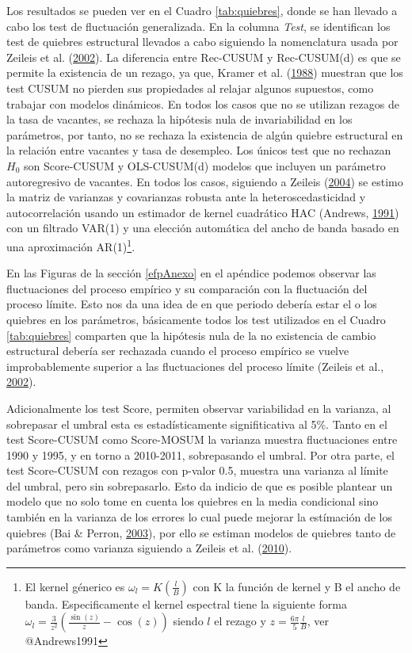 \documentclass[12pt,oneside]{reedthesis}
\begin{document}
Los resultados se pueden ver en el Cuadro \ref{tab:quiebres}, donde se han llevado a cabo los test de fluctuación generalizada. En la columna \emph{Test}, se identifican los test de quiebres estructural llevados a cabo siguiendo la nomenclatura usada por Zeileis et al. (\protect\hyperlink{ref-Zeileis2002}{2002}). La diferencia entre Rec-CUSUM y Rec-CUSUM(d) es que se permite la existencia de un rezago, ya que, Kramer et al. (\protect\hyperlink{ref-Society1988}{1988}) muestran que los test CUSUM no pierden sus propiedades al relajar algunos supuestos, como trabajar con modelos dinámicos. En todos los casos que no se utilizan rezagos de la tasa de vacantes, se rechaza la hipótesis nula de invariabilidad en los parámetros, por tanto, no se rechaza la existencia de algún quiebre estructural en la relación entre vacantes y tasa de desempleo. Los únicos test que no rechazan \(H_0\) son Score-CUSUM y OLS-CUSUM(d) modelos que incluyen un parámetro autoregresivo de vacantes. En todos los casos, siguiendo a Zeileis (\protect\hyperlink{ref-Zeileis2004}{2004}) se estimo la matriz de varianzas y covarianzas robusta ante la heteroscedasticidad y autocorrelación usando un estimador de kernel cuadrático HAC (Andrews, \protect\hyperlink{ref-Andrews1991}{1991}) con un filtrado VAR(1) y una elección automática del ancho de banda basado en una aproximación AR(1)\footnote{El kernel génerico es $\omega_l = K(\frac{l}{B})$ con K la función de kernel y B el ancho de banda. Especificamente el kernel espectral tiene la siguiente forma $\omega_l = \frac{3}{z^2}(\frac{\sin(z)}{z} - \cos(z))$ siendo $l$ el rezago y $z = \frac{6\pi}{5}\frac{l}{B}$, ver @Andrews1991}.

En las Figuras de la sección \ref{efpAnexo} en el apéndice podemos observar las fluctuaciones del proceso empírico y su comparación con la fluctuación del proceso límite. Esto nos da una idea de en que periodo debería estar el o los quiebres en los parámetros, básicamente todos los test utilizados en el Cuadro \ref{tab:quiebres} comparten que la hipótesis nula de la no existencia de cambio estructural debería ser rechazada cuando el proceso empírico se vuelve improbablemente superior a las fluctuaciones del proceso límite (Zeileis et al., \protect\hyperlink{ref-Zeileis2002}{2002}).

Adicionalmente los test Score, permiten observar variabilidad en la varianza, al sobrepasar el umbral esta es estadísticamente signifiticativa al 5\%. Tanto en el test Score-CUSUM como Score-MOSUM la varianza muestra fluctuaciones entre 1990 y 1995, y en torno a 2010-2011, sobrepasando el umbral. Por otra parte, el test Score-CUSUM con rezagos con p-valor 0.5, muestra una varianza al límite del umbral, pero sin sobrepasarlo. Esto da indicio de que es posible plantear un modelo que no solo tome en cuenta los quiebres en la media condicional sino también en la varianza de los errores lo cual puede mejorar la estímación de los quiebres (Bai \& Perron, \protect\hyperlink{ref-BaiPerron2003}{2003}), por ello se estiman modelos de quiebres tanto de parámetros como varianza siguiendo a Zeileis et al. (\protect\hyperlink{ref-Zeileis2010}{2010}).
\end{document}
